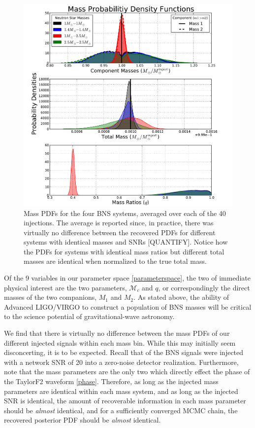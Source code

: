 \documentclass[11pt,a4paper]{emulateapj}
\newcommand{\carl}[1]{{\color{red}  #1}}
\begin{document}
\begin{figure}[ht!]
  \centering
 \includegraphics[trim=2cm 0cm 2cm 0cm, clip=false,scale=0.7]{newMasses.pdf}
 \caption{Mass PDFs for the four BNS systems, averaged over each of the 40 injections.  The average is reported since, in practice, there was virtually no difference between the recovered PDFs for different systems with identical masses and SNRs \carl{[QUANTIFY]}.  Notice how the PDFs for systems with identical mass ratios but different total masses are identical when normalized to the true total mass.}
  \label{metaMassPDFs}
\end{figure}

Of the 9 variables in our parameter space \eqref{parameterspace}, the two of immediate physical
interest are the two parameters, $\mathcal{M}_c$ and $q$, or correspondingly the direct masses 
of the two companions, $M_1$ and $M_2$.    As stated above, the ability of
Advanced LIGO/VIRGO to construct a population of BNS masses will be critical to the science
potential of gravitational-wave astronomy.  

We find that there is virtually no difference between the mass PDFs of our different injected signals
within each mass bin.  While this may initially seem disconcerting, it is to be expected.  Recall that of the BNS signals were injected with a network SNR of 20 into a zero-noise detector realization.  Furthermore, note that the mass parameters are the only two which directly effect the phase of the TaylorF2 waveform \eqref{phase}.  Therefore, as long as the injected mass parameters are identical within each mass system, and as long as the injected SNR is identical, the amount of recoverable information in each mass parameter should be \emph{almost} identical, and for a sufficiently converged MCMC chain, the recovered posterior PDF should be \emph{almost} identical.  
\end{document}

